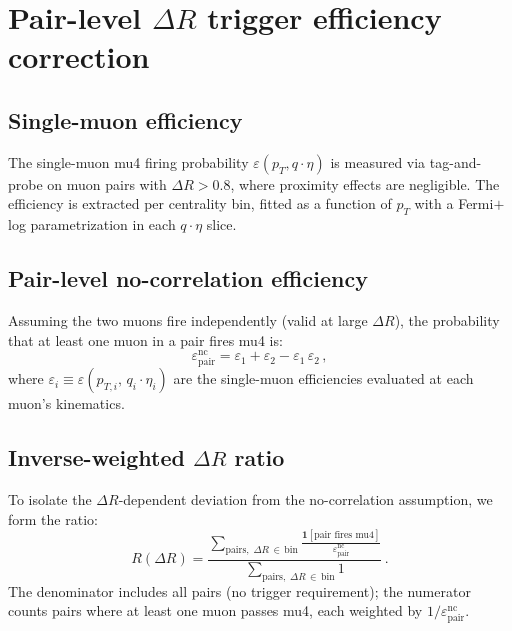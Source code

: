 \documentclass[11pt]{article}
\begin{document}
\section*{Pair-level \texorpdfstring{$\Delta R$}{dR} trigger efficiency correction}

\subsection*{Single-muon efficiency}

The single-muon mu4 firing probability $\varepsilon(p_T, q\!\cdot\!\eta)$ is measured via tag-and-probe on muon pairs with $\Delta R > 0.8$, where proximity effects are negligible. The efficiency is extracted per centrality bin, fitted as a function of $p_T$ with a Fermi$+$log parametrization in each $q\!\cdot\!\eta$ slice.

\subsection*{Pair-level no-correlation efficiency}

Assuming the two muons fire independently (valid at large $\Delta R$), the probability that at least one muon in a pair fires mu4 is:
\begin{equation}
  \varepsilon_{\text{pair}}^{\text{nc}} = \varepsilon_1 + \varepsilon_2 - \varepsilon_1\,\varepsilon_2\,,
\end{equation}
where $\varepsilon_i \equiv \varepsilon(p_{T,i},\, q_i\!\cdot\!\eta_i)$ are the single-muon efficiencies evaluated at each muon's kinematics.

\subsection*{Inverse-weighted \texorpdfstring{$\Delta R$}{dR} ratio}

To isolate the $\Delta R$-dependent deviation from the no-correlation assumption, we form the ratio:
\begin{equation}
  R(\Delta R) = \frac{\displaystyle\sum_{\text{pairs},\;\Delta R\,\in\,\text{bin}}
    \frac{\mathbf{1}[\text{pair fires mu4}]}{\varepsilon_{\text{pair}}^{\text{nc}}}}
    {\displaystyle\sum_{\text{pairs},\;\Delta R\,\in\,\text{bin}} 1}\,.
\end{equation}
The denominator includes all pairs (no trigger requirement); the numerator counts pairs where at least one muon passes mu4, each weighted by $1/\varepsilon_{\text{pair}}^{\text{nc}}$.
\end{document}
